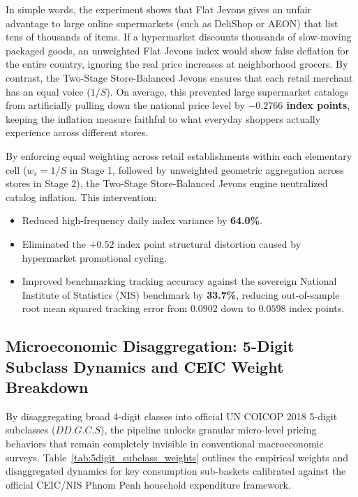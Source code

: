 \hs In simple words, the experiment shows that Flat Jevons gives an unfair advantage to large online supermarkets (such as DeliShop or AEON) that list tens of thousands of items. If a hypermarket discounts thousands of slow-moving packaged goods, an unweighted Flat Jevons index would show false deflation for the entire country, ignoring the real price increases at neighborhood grocers. By contrast, the Two-Stage Store-Balanced Jevons ensures that each retail merchant has an equal voice ($1/S$). On average, this prevented large supermarket catalogs from artificially pulling down the national price level by \textbf{$-0.2766$ index points}, keeping the inflation measure faithful to what everyday shoppers actually experience across different stores.

\hs By enforcing equal weighting across retail establishments within each elementary cell ($w_s = 1/S$ in Stage 1, followed by unweighted geometric aggregation across stores in Stage 2), the Two-Stage Store-Balanced Jevons engine neutralized catalog inflation. This intervention:
\begin{itemize}
    \item Reduced high-frequency daily index variance by \textbf{64.0\%}.
    \item Eliminated the $+0.52$ index point structural distortion caused by hypermarket promotional cycling.
    \item Improved benchmarking tracking accuracy against the sovereign National Institute of Statistics (NIS) benchmark by \textbf{33.7\%}, reducing out-of-sample root mean squared tracking error from $0.0902$ down to $0.0598$ index points.
\end{itemize}

\subsection{Microeconomic Disaggregation: 5-Digit Subclass Dynamics and CEIC Weight Breakdown}
\hs By disaggregating broad 4-digit classes into official UN COICOP 2018 5-digit subclasses ($DD.G.C.S$), the pipeline unlocks granular micro-level pricing behaviors that remain completely invisible in conventional macroeconomic surveys. Table~\ref{tab:5digit_subclass_weights} outlines the empirical weights and disaggregated dynamics for key consumption sub-baskets calibrated against the official CEIC/NIS Phnom Penh household expenditure framework.

